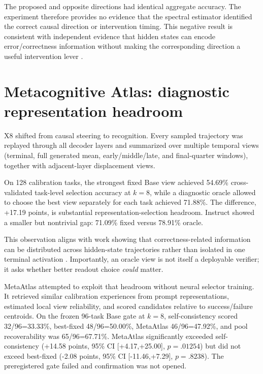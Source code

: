 \documentclass[11pt]{article}
\begin{document}
The proposed and opposite directions had identical aggregate accuracy. The experiment therefore provides no evidence that the spectral estimator identified the correct causal direction or intervention timing. This negative result is consistent with independent evidence that hidden states can encode error/correctness information without making the corresponding direction a useful intervention lever \cite{yuan2026errorawareness}.

\section{Metacognitive Atlas: diagnostic representation headroom}

X8 shifted from causal steering to recognition. Every sampled trajectory was replayed through all decoder layers and summarized over multiple temporal views (terminal, full generated mean, early/middle/late, and final-quarter windows), together with adjacent-layer displacement views.

On 128 calibration tasks, the strongest fixed Base view achieved 54.69\% cross-validated task-level selection accuracy at $k=8$, while a diagnostic oracle allowed to choose the best view separately for each task achieved 71.88\%. The difference, +17.19 points, is substantial representation-selection headroom. Instruct showed a smaller but nontrivial gap: 71.09\% fixed versus 78.91\% oracle.

This observation aligns with work showing that correctness-related information can be distributed across hidden-state trajectories rather than isolated in one terminal activation \cite{damirchi2026trajectory,liang2026clue}. Importantly, an oracle view is not itself a deployable verifier; it asks whether better readout choice \emph{could} matter.

MetaAtlas attempted to exploit that headroom without neural selector training. It retrieved similar calibration experiences from prompt representations, estimated local view reliability, and scored candidates relative to success/failure centroids. On the frozen 96-task Base gate at $k=8$, self-consistency scored 32/96=33.33\%, best-fixed 48/96=50.00\%, MetaAtlas 46/96=47.92\%, and pool recoverability was 65/96=67.71\%. MetaAtlas significantly exceeded self-consistency (+14.58 points, 95\% CI [+4.17,+25.00], $p=.01254$) but did not exceed best-fixed (-2.08 points, 95\% CI [-11.46,+7.29], $p=.8238$). The preregistered gate failed and confirmation was not opened.
\end{document}
